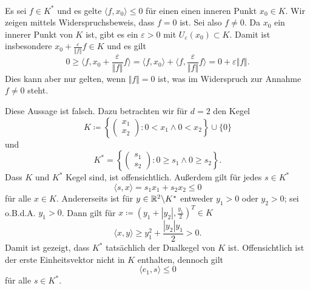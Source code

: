 \begin{compactenum}[(i)]
\begin{compactenum}
 \\
 \end{compactenum}
 \item  Es sei $f\in K^*$ und es gelte $\langle f, x_0\rangle\leq 0$ für einen einen inneren Punkt $x_0\in K$.
 Wir zeigen mittels Widerspruchsbeweis, dass $f=0$ ist. Sei also $f\neq0$. Da $x_0$ ein innerer Punkt von $K$ 
 ist, gibt es ein $\varepsilon>0$ mit $U_\varepsilon(x_0)\subset K$. Damit ist insbesondere 
 $x_0+\frac{\varepsilon}{\Vert f \Vert} f\in K$ und es gilt
 \begin{displaymath}
  0\geq \langle f,x_0+\frac{\varepsilon}{\Vert f \Vert} f\rangle
  = \langle f,x_0\rangle+\langle f,\frac{\varepsilon}{\Vert f \Vert} f\rangle
  =0+\varepsilon \Vert f\Vert.
 \end{displaymath}
 Dies kann aber nur gelten, wenn $\Vert f\Vert=0$ ist, was im Widerspruch zur Annahme $f\neq 0$ steht.
 \\
 \item Diese Aussage ist falsch. Dazu betrachten wir für $d=2$ den Kegel
 \begin{displaymath}
  K\coloneqq\left\{\begin{pmatrix}x_1\\x_2\end{pmatrix}: 0< x_1 \land 0< x_2 \right\}\cup\{0\}
 \end{displaymath}
  und
  \begin{displaymath}
  K^*=\left\{\begin{pmatrix}s_1\\s_2\end{pmatrix}: 0\geq s_1 \land 0\geq s_2 \right\}.
 \end{displaymath}
 Dass $K$ und $K^*$ Kegel sind, ist offensichtlich. Außerdem gilt für jedes $s\in K^*$
 \begin{displaymath}
  \langle s,x\rangle =s_1x_1+s_2x_2\leq 0
 \end{displaymath}
 für alle $x\in K$. Andererseits ist für $y\in \mathbb{R}^2\backslash K^*$ entweder $y_1>0$ oder $y_2>0$;
 sei o.B.d.A. $y_1>0$. Dann gilt für $x\coloneqq(y_1+|y_2|,\frac{y_1}{2})^T\in K$
 \begin{displaymath}
  \langle x, y\rangle \geq y_1^2+\frac{|y_2|y_1}{2}>0.
 \end{displaymath}
 Damit ist gezeigt, dass $K^*$ tatsächlich der Dualkegel von $K$ ist. Offensichtlich ist der 
 erste Einheitsvektor nicht in $K$ enthalten, dennoch gilt
  \begin{displaymath}
  \langle e_1, s\rangle \leq 0
 \end{displaymath}
 für alle $s\in K^*$.
\end{compactenum}
